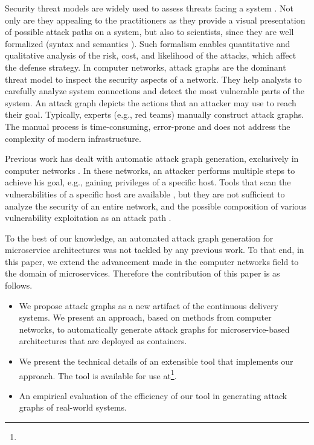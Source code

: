 Security threat models are widely used to assess threats facing a system \cite{kordy2014dag}. Not only are they appealing to the practitioners as they provide a visual presentation of possible attack paths on a system, but also to scientists, since they are well formalized (syntax and semantics \cite{mauw2005foundations,jha2002two}). Such formalism enables quantitative and qualitative analysis of the risk, cost, and likelihood of the attacks, which affect the defense strategy. In computer networks, attack graphs \cite{sheyner2002automated,ou2006scalable} are the dominant threat model to inspect the security aspects of a network. They help analysts to carefully analyze system connections and detect the most vulnerable parts of the system. An attack graph depicts the actions that an attacker may use to reach their goal. Typically, experts (e.g., red teams) manually construct attack graphs. The manual process is time-consuming, error-prone and does not address the complexity of modern infrastructure.  %


Previous work has dealt with automatic attack graph generation, exclusively in computer networks \cite{ingols2006practical, sheyner2002automated, ou2006scalable}. In these networks, an attacker performs multiple steps to achieve his goal, e.g., gaining privileges of a specific host. Tools that scan the vulnerabilities of a specific host are available \cite{farmer1990cops}, but they are not sufficient to analyze the security of an entire network, and the possible composition of various vulnerability exploitation as an attack path \cite{sheyner2002automated}. 

To the best of our knowledge, an automated attack graph generation for microservice architectures was not tackled by any previous work. To that end, in this paper, we extend the advancement made in the computer networks field to the domain of microservices. Therefore the contribution of this paper is as follows.
\begin{itemize}
	\item We propose attack graphs as a new artifact of the continuous delivery systems. We present an approach, based on methods from computer networks, to automatically generate attack graphs for microservice-based architectures that are deployed as containers.   
	\item We present the technical details of an extensible tool that implements our approach. The tool is available for use at\footnote{}.
	\item An empirical evaluation of the efficiency of our tool in generating attack graphs of real-world systems.
\end{itemize}



